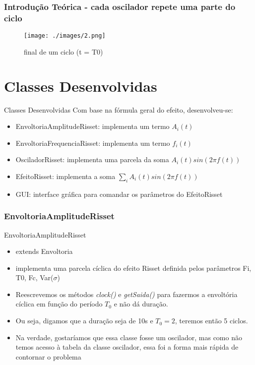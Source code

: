 \documentclass{beamer}
\begin{document}
\begin{frame}
 \frametitle{Introdução Teórica - cada oscilador repete uma parte do ciclo}
 \begin{figure}
  \texttt{[image: ./images/2.png]}
\caption{final de um ciclo (t = T0)}  
    \end{figure}
\end{frame}


\section{Classes Desenvolvidas}

\begin{frame}{Classes Desenvolvidas}
Com base na fórmula geral do efeito, desenvolveu-se:
\begin{itemize}
\item EnvoltoriaAmplitudeRisset: implementa um termo $A_i(t)$
\item EnvoltoriaFrequenciaRisset: implementa um termo $f_i(t)$
\item OsciladorRisset: implementa uma parcela da soma $A_i(t)sin(2 \pi f(t))$
\item EfeitoRisset: implementa a soma $\sum_i A_i(t)sin(2 \pi f(t))$
\item GUI: interface gráfica para comandar os parâmetros do EfeitoRisset
\end{itemize}

\end{frame}

\subsubsection{EnvoltoriaAmplitudeRisset}
\begin{frame}{EnvoltoriaAmplitudeRisset}
\begin{itemize}
	\item extends Envoltoria
	\item implementa uma parcela cíclica do efeito Risset definida pelos parâmetros
	 Fi, T0, Fc, Var($\sigma$)
	 \item Reescrevemos os métodos \emph{clock()} e \emph{getSaida()} para 
	 fazermos a envoltória cíclica em função do período $T_0$ e não dá duração.
	 \item Ou seja, digamos que a duração seja de 10s e $T_0 = 2$, teremos então
	 5 ciclos.
	 \item Na verdade, gostaríamos que essa classe fosse um oscilador, mas como não
	 temos acesso à tabela da classe oscilador, essa foi a forma mais rápida 
	 de contornar o problema
\end{itemize}

\end{frame}
\end{document}
